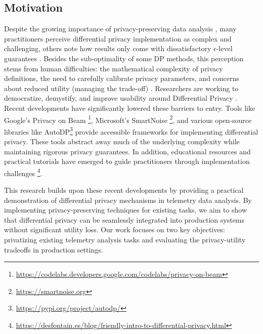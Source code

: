 \documentclass[12pt,letterpaper]{article}
\begin{document}
\subsection{Motivation}

Despite the growing importance of privacy-preserving data analysis \cite{PewPrivacy2019}, many practitioners perceive differential privacy implementation as complex and challenging, others note how results only come with dissatisfactory $\epsilon$-level guarantees \cite{FLandPrivacy}. Besides the sub-optimality of some DP methods, this perception stems from human difficulties: the mathematical complexity of privacy definitions, the need to carefully calibrate privacy parameters, and concerns about reduced utility (managing the trade-off) \cite{DP-fyML}. Researchers are working to democratize, demystify, and improve usability around Differential Privacy \cite{DP-fyML}. Recent developments have significantly lowered these barriers to entry. Tools like Google's Privacy on Beam \footnote{\url{https://codelabs.developers.google.com/codelabs/privacy-on-beam}}, Microsoft's SmartNoise \footnote{\url{https://smartnoise.org}}, and various open-source libraries like AutoDP\footnote{\url{https://pypi.org/project/autodp/}} provide accessible frameworks for implementing differential privacy. These tools abstract away much of the underlying complexity while maintaining rigorous privacy guarantees. In addition, educational resources and practical tutorials have emerged to guide practitioners through implementation challenges \footnote{\url{https://desfontain.es/blog/friendly-intro-to-differential-privacy.html}}.


This research builds upon these recent developments by providing a practical demonstration of differential privacy mechanisms in telemetry data analysis. By implementing privacy-preserving techniques for existing tasks, we aim to show that differential privacy can be seamlessly integrated into production systems without significant utility loss. Our work focuses on two key objectives: privatizing existing telemetry analysis tasks and evaluating the privacy-utility tradeoffs in production settings.
\end{document}
